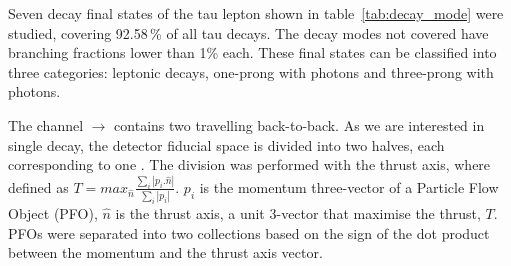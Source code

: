 \documentclass[a4paper,11pt]{article}
\begin{document}
Seven decay final states of the tau lepton shown in table~\ref{tab:decay_mode} were studied, covering 92.58\,\% of all tau decays. The decay modes not covered have branching fractions lower than 1\% each. These final states can be classified into three categories: leptonic decays, one-prong with photons and three-prong with photons. 

The channel \Pem\Pep $\to$ \PGtm\PGtp contains two \PGt travelling back-to-back. As we are interested in single \PGt decay, the detector fiducial space is divided into two halves, each corresponding to one \PGt. The division was performed with the thrust axis, where defined as 
$T = max_{\hat{n}} \frac {\sum_i \left| p_i . \hat{n} \right|}{\sum_i \left| p_i \right|}$. $p_i$ is the momentum three-vector of a Particle Flow Object (PFO), $\hat{n}$ is the thrust axis, a unit 3-vector that maximise the thrust, $T$. PFOs were separated into two collections based on the sign of the dot product between the momentum and the thrust axis vector.
\end{document}

